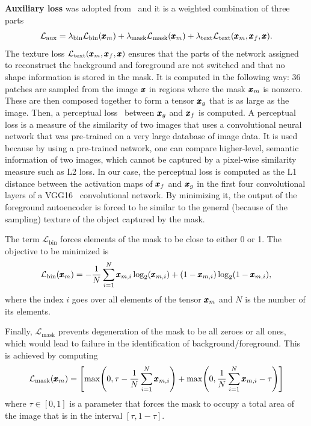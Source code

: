 \textbf{Auxiliary loss} was adopted from~\cite{sauer2021counterfactual} and it is a weighted combination of three parts
\begin{equation} \label{eq:auxloss}
    \mathcal{L}_{\text{aux}} = \lambda_{\text{bin}}\mathcal{L}_{\text{bin}}(\pmb{{x}}_m) + \lambda_{\text{mask}}\mathcal{L}_{\text{mask}}(\pmb{{x}}_m) + \lambda_{\text{text}}\mathcal{L}_{\text{text}}(\pmb{{x}}_m,\pmb{{x}}_f,\pmb{{x}}).
\end{equation} 
The texture loss $\mathcal{L}_{\text{text}}(\pmb{{x}}_m,\pmb{{x}}_f,\pmb{{x}})$ ensures that the parts of the network assigned to reconstruct the background and foreground are not switched and that no shape information is stored in the mask. It is computed in the following way: 36 patches are sampled from the image $\pmb{{x}}$ in regions where the mask $\pmb{{x}}_m$ is nonzero. These are then composed together to form a tensor $\pmb{{x}}_g$ that is as large as the image. Then, a perceptual loss~\cite{johnson2016perceptual} between $\pmb{{x}}_g$ and $\pmb{{x}}_f$ is computed. A perceptual loss is a measure of the similarity of two images that uses a convolutional neural network that was pre-trained on a very large database of image data. It is used because by using a pre-trained network, one can compare higher-level, semantic information of two images, which cannot be captured by a pixel-wise similarity measure such as L2 loss. In our case, the perceptual loss is computed as the L1 distance between the activation maps of $\pmb{{x}}_f$ and $\pmb{{x}}_g$ in the first four convolutional layers of a VGG16~\cite{simonyan2014very} convolutional network. By minimizing it, the output of the foreground autoencoder is forced to be similar to the general (because of the sampling) texture of the object captured by the mask.

The term $\mathcal{L}_{\text{bin}}$ forces elements of the mask to be close to either 0 or 1. The objective to be minimized is
\begin{equation}
    \mathcal{L}_{\text{bin}}(\pmb{{x}}_m) = - \frac{1}{N} \sum_{i=1}^N \pmb{{x}}_{m,i} \log_2(\pmb{{x}}_{m,i}) + (1-\pmb{{x}}_{m,i}) \log_2(1 - \pmb{{x}}_{m,i}),
\end{equation}
where the index $i$ goes over all elements of the tensor $\pmb{{x}}_m$ and $N$ is the number of its elements.

 Finally, $\mathcal{L}_{\text{mask}}$ prevents degeneration of the mask to be all zeroes or all ones, which would lead to failure in the identification of background/foreground. This is achieved by computing
  \begin{equation}
    \mathcal{L}_{\text{mask}}(\vc{x}_m) = \left[ \max \left( 0, \tau - \frac{1}{N} \sum_{i=1}^N \vc{x}_{m,i} \right) + \max \left( 0, \frac{1}{N} \sum_{i=1}^N \vc{x}_{m,i} -\tau  \right) \right]
\end{equation}
where $\tau \in [0,1]$ is a parameter that forces the mask to occupy a total area of the image that is in the interval $[\tau, 1-\tau]$. 

